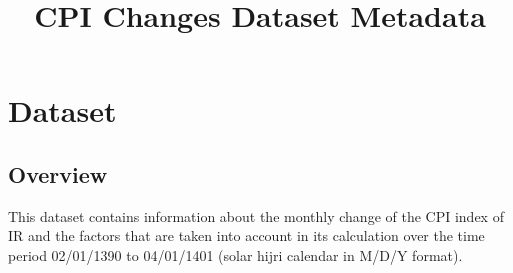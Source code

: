 \documentclass[fleqn]{report}
\begin{document}
\pagestyle{fancy}
\fancyhf{}

\title{CPI Changes Dataset Metadata}
\date{}
\maketitle

\newpage

\chapter*{Dataset}
\section*{Overview}
This dataset contains information about the monthly change of the CPI index of IR and the factors that are taken into account in its calculation over the time period 02/01/1390 to 04/01/1401 (solar hijri calendar in M/D/Y format).
\end{document}
